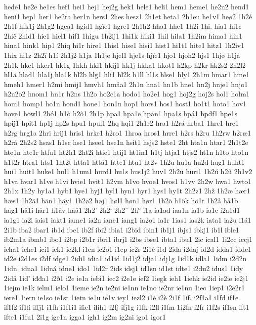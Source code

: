 hede1
he2e
he1es
hef1
hei1
hej1
hej2g
hek1
hele1
heli1
hem1
heme1
he2n2
hend1
heni1
hep1
her1
he2ra
her1n
hers1
2hes
hesz1
2h1et
heta1
2h1eu
he1v1
heø2
1h2é
2h1f
hfk1j
2h1g2
hgea1
hgid1
hgïe1
hgre1
2h1h2
hha1
hhe1
1h2i
1hi.
hia1
hi1c
2hič
2hid1
hie1
hiel1
hif1
1higu
1h2ij1
1hi1k
hiki1
1hil
hila1
1h2im
hima1
hin1
hina1
hink1
hip1
2hiq
hi1r
hire1
1his1
hise1
hisi1
hist1
hi1t1
hite1
hitz1
1h2iv1
1hix
hi1z
2h2ï
h1í
2h1j2
h1ja
1h1je
hjel1
hje1s
hjïe1
hjo1
hjoh2
hjs1
1hjø
h1jå
2h1k
hke1
hker1
hk1g
1hkh
hki1
hkij1
hk1j
hkka1
hkot1
h2kp
h2kr
hk2s2
2h2l2
hl1a
hlad1
hla1j
hla1k
hl2b
hlg1
hli1
hl2k
h1ll
hl1s
hlse1
hly1
2h1m
hmar1
hme1
hmeh1
hmer1
h2mi
hmij1
hmvh1
hmåa1
2h1n
hna1
hn1b
hne1
hn2j
hnje1
hnjo1
h2n2o2
hnom1
hn1r
h2ns
1h2o
ho2c1a
hodo1
ho2e1
hog1
hoj2g
hoj2s
hol1
holm1
hom1
homp1
ho1n
hond1
hone1
hon1n
hop1
hors1
hos1
host1
ho1t1
hoto1
hov1
hove1
howl1
2hó1
h1ò
h2ô1
2h1p
hpa1
hpa1e
hpan1
hpa1s
hpá1
hpdf1
hpe1s
hpij1
hpit1
hp1j
hp2s
hpu1
hpul1
2hq
hqi1
2h1r2
hra1
h2rá
hrba1
1hrc1
hre1
h2rg
hrg1a
2hri
hrij1
hris1
hrke1
h2ro1
1hroa
hros1
hrre1
h2rs
h2ru
1h2rw
h2ræ1
h2rå
2h2s2
hsas1
h1sc
hse1
hsee1
hse1n
hsit1
hsjs2
hste1
2ht
hta1n
htar1
2h1t2e
hte1n
hte1r
htfu1
ht2h1
2ht2i
htie1
htij1
ht1in1
h1tj
htja1
htjs2
ht1n
h1to
hto1n
h1t2r
htra1
hts1
1ht2t
htta1
httá1
htte1
htu1
ht2v
1h2u
hu1a
hu2d
hug1
huht1
hui1
huit1
huke1
hul1
h1um1
hurd1
hu1s
hus1j2
huv1
2h2ü
hüri1
1h2ú
h2û
2h1v2
h1va
hvar1
h1ve
h1vi
hvie1
hvit1
h2vm
h1vo
hvoe1
hvos1
h1vv
2h2w
hwa1
hwto1
2h1x
1h2y
hy1a1
hyb1
hye1
hyj1
hyl1
hyn1
hyr1
hys1
hy1t
2h2z1
2hž
1h2æ
hær1
hæs1
1h2ä1
hän1
häy1
1h2ø2
høj1
høl1
høn1
hør1
1h2ö
h1ök
hö1r
1h2å
hå1b
håg1
hå1i
hår1
h1åv
håå1
2h2'
2h2`
2h2´
2h°
i1a
ia1ad
iaa1n
ia1b
ia1c
i2a1d1
ia1g1
ia2i
iais1
iakt1
iame1
ia2n
iane1
iang1
ia2o1
ia1r
1ias1
ias2k
iata1
ia2u
i1á1
2i1b
iba2
ibar1
ib1d
ibe1
ib2f
ibi2
ibia1
i2bid
ibin1
ib1j1
ibjs1
ibkj1
ib1l
ible1
ib2m1a
ibmb1
ibo1
i2bp
i2b1r
ibri1
ibrj1
i2bs
ibse1
ibta1
ibu1
2ic
ical1
1i2cc
iccj1
icha1
iche1
ici1
ick1
ic2kl
i1cn
ic2o1
i1cp
ic2r
2i1č
i1d
2ida
i2daj
id2d
idda1
idde1
id2e
i2d1es
i2df
idge1
2idi1
idia1
id1id
1id1j2
idja1
idj1g
1id1k
idla1
1idm
i2d2n
1idn.
idna1
1idná
idne1
ido1
1id2r
2ids
idsj1
id1sn
id1st
idte1
i2du2
idus1
1idy
2idä
1id'
iđđa1
i2ð1
i2e
ie1a
iebi1
iec2
i2e1e
ief2
1iegk
ieh1
1iehk
ie2id
ie2ie
ie2j1
1iejm
ie1k
ielm1
ielo1
1ieme
ie2n
ie2ni
ie1nn
ie1no
ie2nr
ie1nu
1ieo
1iep1
i2e2r1
iere1
1iern
ie1so
ie1st
1ietn
ie1u
ie1v
iey1
iezl2
i1é
i2è
2i1f
1if.
i2f1a1
i1fd
if1e
if1f2
if1fi
iffj1
i1fh
i1f1i1
ifie1
ifih1
i2fj
ifj1g
i1fk
i2fl
i1fm
1i2fn
i2fr
i1f2s
if1sn
ift1
ifte1
i1fu1
2i1g
ige1n
igga1
igh1
ig2m
ig2ni
igo1
igor1
